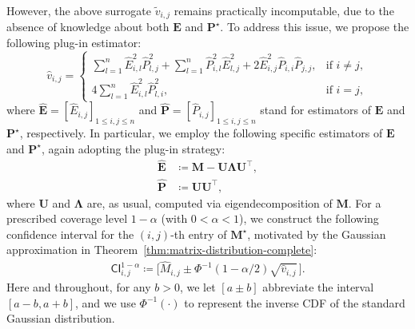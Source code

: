 However, the above surrogate $\widetilde{v}_{i,j}$ remains practically incomputable, 
due to the absence of knowledge about both $\bm{E}$ and $\bm{P}^{\star}$.   
To address this issue, we propose the following plug-in estimator:
%
\begin{equation}
	\widehat{v}_{i,j}=\begin{cases}
	\sum_{l=1}^{n}\widehat{E}_{i,l}^{2}\widehat{P}_{l,j}^{2}+\sum_{l=1}^{n}\widehat{P}_{i,l}^{2}\widehat{E}_{l,j}^{2}+2\widehat{E}_{i,j}^{2}\widehat{P}_{i,i}\widehat{P}_{j,j}, & \text{if }i\neq j,\\
	4\sum_{l=1}^{n}\widehat{E}_{i,l}^{2}\widehat{P}_{l,i}^{2}, & \text{if }i=j, 
\end{cases}
	\label{eq:v-ij-plugin-estimator}
\end{equation}
%
where $\widehat{\bm{E}}=[\widehat{E}_{i,j}]_{1\leq i,j\leq n}$ and $\widehat{\bm{P}}=[\widehat{P}_{i,j}]_{1\leq i,j\leq n}$ stand for estimators of $\bm{E}$ and $\bm{P}^{\star}$, respectively. 
In particular, we employ the following specific estimators of $\bm{E}$ and $\bm{P}^{\star}$, again adopting the plug-in strategy:
%
\begin{subequations}
\label{eq:estimators-E-and-P}
\begin{align}
\widehat{\bm{E}} & \coloneqq\bm{M}-\bm{U}\bm{\Lambda}\bm{U}^{\top},\label{eq:estimator-noise-matrix-E}\\
\widehat{\bm{P}} & \coloneqq\bm{U}\bm{U}^{\top},\label{eq:estimator-projection-P}
\end{align}
\end{subequations}
%
where $\bm{U}$ and $\bm{\Lambda}$ are, as usual, computed via eigendecomposition of $\bm{M}$. 
For a prescribed coverage level $1-\alpha$ (with $0<\alpha <1$), we construct the following confidence interval for the $(i,j)$-th entry of $\bm{M}^{\star}$, 
motivated by the Gaussian approximation in Theorem~\ref{thm:matrix-distribution-complete}: 
%
\begin{align}
	\label{eq:confidence-interval-construction-general}
	\mathsf{CI}_{i,j}^{1-\alpha} \coloneqq \Big[\widehat{M}_{i,j}\pm\Phi^{-1}(1-\alpha/2)\sqrt{\widehat{v}_{i,j}}\,\Big].
\end{align}
%
Here and throughout, for any $b>0$, we let $[a\pm b]$ abbreviate the interval $[a-b,a+b]$, and we use $\Phi^{-1}(\cdot)$ to represent the inverse CDF of the standard Gaussian distribution. 


